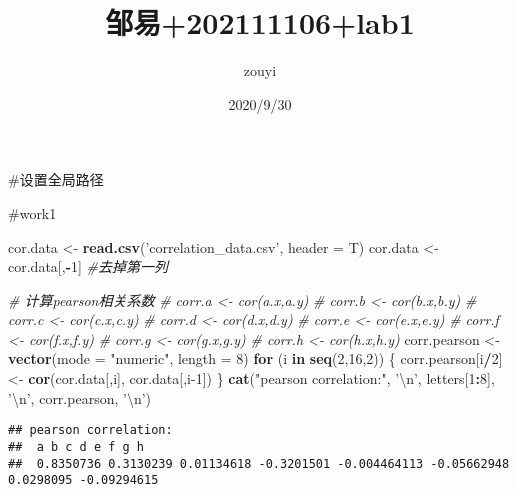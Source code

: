 \documentclass[
]{article}
\title{邹易+202111106+lab1}
\author{zouyi}
\date{2020/9/30}
\newenvironment{Shaded}{\begin{snugshade}}{\end{snugshade}}
\newcommand{\CharTok}[1]{\textcolor[rgb]{0.31,0.60,0.02}{#1}}
\newcommand{\CommentTok}[1]{\textcolor[rgb]{0.56,0.35,0.01}{\textit{#1}}}
\newcommand{\ControlFlowTok}[1]{\textcolor[rgb]{0.13,0.29,0.53}{\textbf{#1}}}
\newcommand{\DataTypeTok}[1]{\textcolor[rgb]{0.13,0.29,0.53}{#1}}
\newcommand{\DecValTok}[1]{\textcolor[rgb]{0.00,0.00,0.81}{#1}}
\newcommand{\KeywordTok}[1]{\textcolor[rgb]{0.13,0.29,0.53}{\textbf{#1}}}
\newcommand{\NormalTok}[1]{#1}
\newcommand{\OperatorTok}[1]{\textcolor[rgb]{0.81,0.36,0.00}{\textbf{#1}}}
\newcommand{\StringTok}[1]{\textcolor[rgb]{0.31,0.60,0.02}{#1}}
\begin{document}
\maketitle

\#设置全局路径

\#work1

\begin{Shaded}
\begin{Highlighting}[]
\NormalTok{cor.data <-}\StringTok{ }\KeywordTok{read.csv}\NormalTok{(}\StringTok{'correlation_data.csv'}\NormalTok{, }\DataTypeTok{header =}\NormalTok{ T)}
\NormalTok{cor.data <-}\StringTok{ }\NormalTok{cor.data[,}\OperatorTok{-}\DecValTok{1}\NormalTok{]  }\CommentTok{#去掉第一列}

\CommentTok{# 计算pearson相关系数}
\CommentTok{# corr.a <- cor(a.x,a.y)}
\CommentTok{# corr.b <- cor(b.x,b.y)}
\CommentTok{# corr.c <- cor(c.x,c.y)}
\CommentTok{# corr.d <- cor(d.x,d.y)}
\CommentTok{# corr.e <- cor(e.x,e.y)}
\CommentTok{# corr.f <- cor(f.x,f.y)}
\CommentTok{# corr.g <- cor(g.x,g.y)}
\CommentTok{# corr.h <- cor(h.x,h.y)}
\NormalTok{corr.pearson <-}\StringTok{ }\KeywordTok{vector}\NormalTok{(}\DataTypeTok{mode =} \StringTok{"numeric"}\NormalTok{, }\DataTypeTok{length =} \DecValTok{8}\NormalTok{)}
\ControlFlowTok{for}\NormalTok{ (i }\ControlFlowTok{in} \KeywordTok{seq}\NormalTok{(}\DecValTok{2}\NormalTok{,}\DecValTok{16}\NormalTok{,}\DecValTok{2}\NormalTok{)) \{}
\NormalTok{  corr.pearson[i}\OperatorTok{/}\DecValTok{2}\NormalTok{] <-}\StringTok{ }\KeywordTok{cor}\NormalTok{(cor.data[,i], cor.data[,i}\DecValTok{-1}\NormalTok{])}
\NormalTok{\}}
\KeywordTok{cat}\NormalTok{(}\StringTok{"pearson correlation:"}\NormalTok{, }\StringTok{'}\CharTok{\textbackslash{}n}\StringTok{'}\NormalTok{, letters[}\DecValTok{1}\OperatorTok{:}\DecValTok{8}\NormalTok{], }\StringTok{'}\CharTok{\textbackslash{}n}\StringTok{'}\NormalTok{, corr.pearson, }\StringTok{'}\CharTok{\textbackslash{}n}\StringTok{'}\NormalTok{)}
\end{Highlighting}
\end{Shaded}

\begin{verbatim}
## pearson correlation: 
##  a b c d e f g h 
##  0.8350736 0.3130239 0.01134618 -0.3201501 -0.004464113 -0.05662948 0.0298095 -0.09294615
\end{verbatim}
\end{document}
